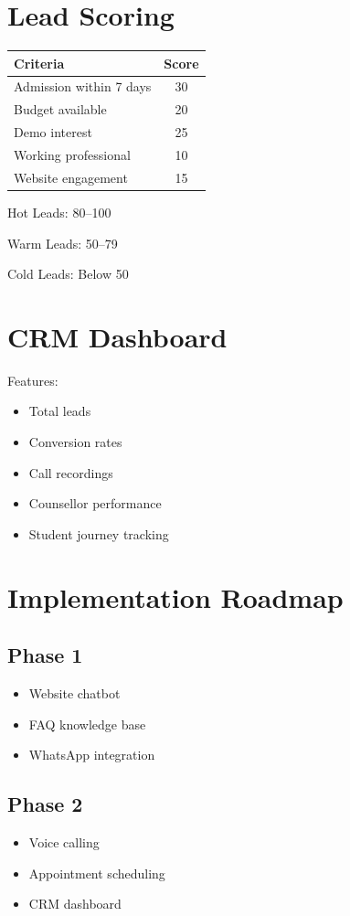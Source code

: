 \documentclass[11pt,a4paper]{article}
\begin{document}
\section{Lead Scoring}

\begin{tabular}{|p{8cm}|c|}
\hline
Criteria & Score \\
\hline
Admission within 7 days & 30 \\
Budget available & 20 \\
Demo interest & 25 \\
Working professional & 10 \\
Website engagement & 15 \\
\hline
\end{tabular}

\bigskip

Hot Leads: 80--100

Warm Leads: 50--79

Cold Leads: Below 50

\section{CRM Dashboard}

Features:
\begin{itemize}
\item Total leads
\item Conversion rates
\item Call recordings
\item Counsellor performance
\item Student journey tracking
\end{itemize}

\section{Implementation Roadmap}

\subsection{Phase 1}
\begin{itemize}
\item Website chatbot
\item FAQ knowledge base
\item WhatsApp integration
\end{itemize}

\subsection{Phase 2}
\begin{itemize}
\item Voice calling
\item Appointment scheduling
\item CRM dashboard
\end{itemize}
\end{document}
